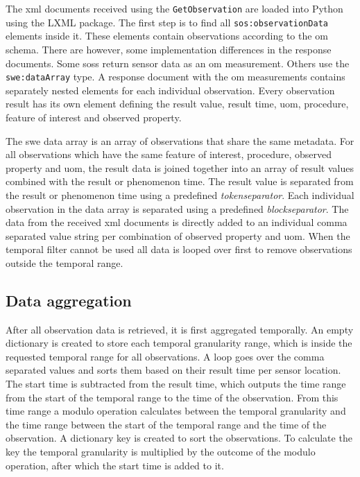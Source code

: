 \begin{sloppypar}
The \ac{xml} documents received using the \texttt{GetObservation} are loaded into Python using the LXML package. The first step is to find all \texttt{sos:observationData} elements inside it. These elements contain observations according to the \ac{om} schema. There are however, some implementation differences in the response documents. Some \aclp{sos} return sensor data as an \ac{om} measurement. Others use the \texttt{swe:dataArray} type. A response document with the \ac{om} measurements contains separately nested elements for each individual observation. Every observation result has its own element defining the result value, result time, \ac{uom}, procedure, feature of interest and observed property.  
\end{sloppypar}

The \ac{swe} data array is an array of observations that share the same metadata. For all observations which have the same feature of interest, procedure, observed property and \ac{uom}, the result data is joined together into an array of result values combined with the result or phenomenon time. The result value is separated from the result or phenomenon time using a predefined \textit{tokenseparator}. Each individual observation in the data array is separated using a predefined \textit{blockseparator}. The data from the received \ac{xml} documents is directly added to an individual comma separated value string per combination of observed property and \ac{uom}. When the temporal filter cannot be used all data is looped over first to remove observations outside the temporal range. 

\subsection{Data aggregation}
After all observation data is retrieved, it is first aggregated temporally. An empty dictionary is created to store each temporal granularity range, which is inside the requested temporal range for all observations. A loop goes over the comma separated values and sorts them based on their result time per sensor location. The start time is subtracted from the result time, which outputs the time range from the start of the temporal range to the time of the observation. From this time range a modulo operation calculates between the temporal granularity and the time range between the start of the temporal range and the time of the observation. A dictionary key is created to sort the observations. To calculate the key the temporal granularity is multiplied by the outcome of the modulo operation, after which the start time is added to it. 

